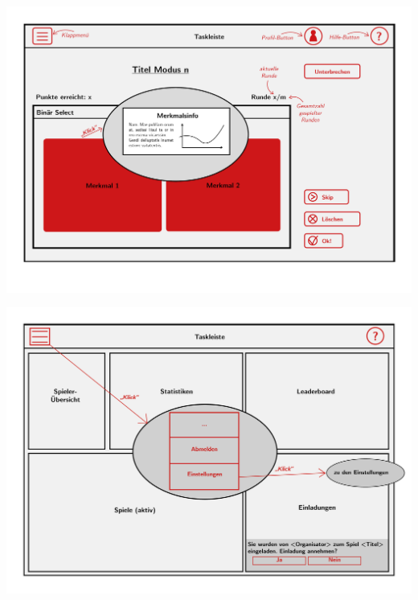 \documentclass[xcolor=dvipsnames]{beamer}
\begin{document}
	\begin{frame}
	\includegraphics[width=\textwidth]{../../pictures/BinSelect.jpg}
	\end{frame}
	\begin{frame}
	\includegraphics[width=\textwidth]{../../pictures/5_Spieler.jpg}
	\end{frame}
\end{document}
